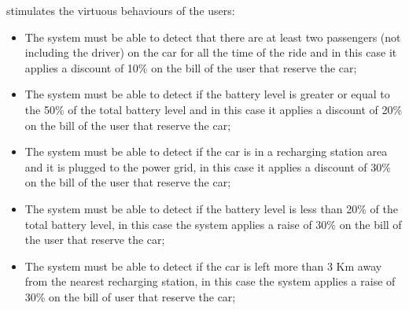 \item stimulates  the virtuous behaviours of the users:
\begin{itemize}
\item The system must be able to detect that there are at least two passengers (not including the driver) on the car for all the time of the ride and in this case it applies a discount of 10\% on the bill of the user that reserve the car;
\item The system must be able to detect if  the battery level is greater or equal to the 50\% of the total battery level and in this case it applies a discount of 20\% on the bill of the user that reserve the car;
\item The system must be able to detect if the car is in a recharging station area and it is plugged to the power grid, in this case it applies a discount of 30\% on the bill of the user that reserve the car;
\item The system must be able to detect if the battery level is less than 20\% of the total battery level, in this case the system applies a raise of 30\% on the bill of the user that reserve the car;
\item The system must be able to detect if the car is left more than 3 Km away from the nearest recharging station, in this case the system applies a raise of 30\% on the bill of user that reserve the car;
\end{itemize}
